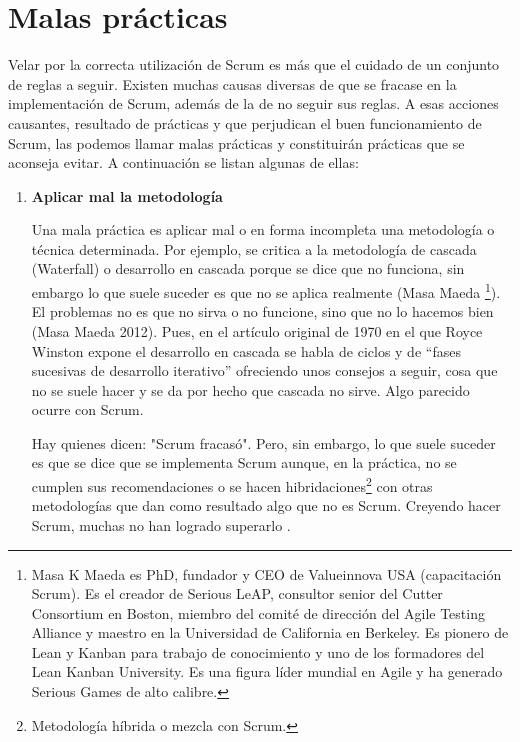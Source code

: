 
\chapter{Malas prácticas}

Velar por la correcta utilización de Scrum es más que el cuidado de un conjunto de reglas a seguir. Existen muchas causas diversas de que se fracase en la implementación de Scrum, además de la de no seguir sus reglas. A esas acciones causantes, resultado de prácticas y que perjudican el buen funcionamiento de Scrum, las podemos llamar malas prácticas y constituirán prácticas que se aconseja evitar.
A continuación se listan algunas de ellas:

\begin{enumerate}

\item \textbf{Aplicar mal la metodología}

Una mala práctica es aplicar mal o en forma incompleta una metodología o técnica determinada. Por ejemplo, se critica a la metodología de cascada (Waterfall) o desarrollo en cascada porque se dice que no funciona, sin embargo lo que suele suceder es que no se aplica realmente (Masa Maeda \footnote{Masa K Maeda es PhD, fundador y CEO de Valueinnova USA (capacitación Scrum). Es el creador de Serious LeAP, consultor senior del Cutter Consortium en Boston, miembro del comité de dirección del Agile Testing Alliance y maestro en la Universidad de California en Berkeley. Es pionero de Lean y Kanban para trabajo de conocimiento y uno de los formadores del Lean Kanban University. Es una figura líder mundial en Agile y ha generado Serious Games de alto calibre.}). El problemas no es que no sirva o no funcione, sino que no lo hacemos bien (Masa Maeda  2012). Pues, en el artículo original de 1970 en el que Royce Winston expone el desarrollo en cascada se habla de ciclos y de “fases sucesivas de desarrollo iterativo” \cite{Winston-Royce-1970} ofreciendo unos consejos a seguir, cosa que no se suele hacer y se da por hecho que cascada no sirve. Algo parecido ocurre con Scrum.

Hay quienes dicen:  "Scrum fracasó". Pero, sin embargo, lo que suele suceder es que se dice que se implementa Scrum aunque, en la práctica, no se cumplen sus recomendaciones o se hacen hibridaciones\footnote{Metodología híbrida o mezcla con Scrum.} con otras metodologías que dan como resultado algo que no es Scrum. Creyendo hacer Scrum, muchas no han logrado superarlo \cite{Gantthead-James-2010}.  


\end{enumerate}
